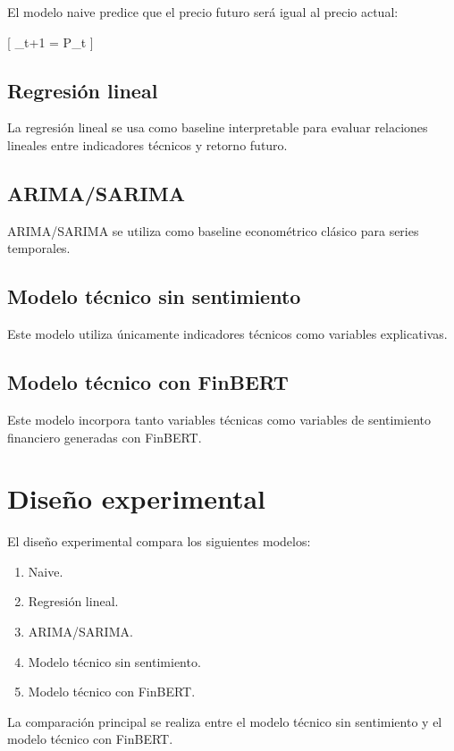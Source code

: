\documentclass[12pt,a4paper]{article}
\begin{document}
El modelo naive predice que el precio futuro será igual al precio actual:

[
_{t+1} = P_t
]

\subsection{Regresión lineal}

La regresión lineal se usa como baseline interpretable para evaluar relaciones lineales entre indicadores técnicos y retorno futuro.

\subsection{ARIMA/SARIMA}

ARIMA/SARIMA se utiliza como baseline econométrico clásico para series temporales.

\subsection{Modelo técnico sin sentimiento}

Este modelo utiliza únicamente indicadores técnicos como variables explicativas.

\subsection{Modelo técnico con FinBERT}

Este modelo incorpora tanto variables técnicas como variables de sentimiento financiero generadas con FinBERT.

\section{Diseño experimental}

El diseño experimental compara los siguientes modelos:

\begin{enumerate}
\item Naive.
\item Regresión lineal.
\item ARIMA/SARIMA.
\item Modelo técnico sin sentimiento.
\item Modelo técnico con FinBERT.
\end{enumerate}

La comparación principal se realiza entre el modelo técnico sin sentimiento y el modelo técnico con FinBERT.
\end{document}
